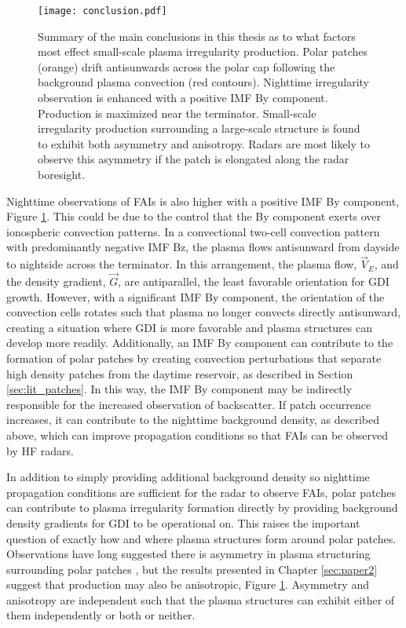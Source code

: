 \begin{figure}
  \texttt{[image: conclusion.pdf]}
  \caption[Irregularity production factors]{Summary of the main conclusions in this thesis as to what factors most effect small-scale plasma irregularity production.  Polar patches (orange) drift antisunwards across the polar cap following the background plasma convection (red contours).  Nighttime irregularity observation is enhanced with a positive IMF By component.  Production is maximized near the terminator.  Small-scale irregularity production surrounding a large-scale structure is found to exhibit both asymmetry and anisotropy.  Radars are most likely to observe this asymmetry if the patch is elongated along the radar boresight.}
  \label{fig:conclusion}
\end{figure}

Nighttime observations of FAIs is also higher with a positive IMF By component, Figure \ref{fig:conclusion}.  This could be due to the control that the By component exerts over ionospheric convection patterns.  In a convectional two-cell convection pattern with predominantly negative IMF Bz, the plasma flows antisunward from dayside to nightside across the terminator.  In this arrangement, the plasma flow, \(\vec{V}_E\), and the density gradient, \(\vec{G}\), are antiparallel, the least favorable orientation for GDI growth.  However, with a significant IMF By component, the orientation of the convection cells rotates such that plasma no longer convects directly antisunward, creating a situation where GDI is more favorable and plasma structures can develop more readily.  Additionally, an IMF By component can contribute to the formation of polar patches by creating convection perturbations that separate high density patches from the daytime reservoir, as described in Section \ref{sec:lit_patches}.  In this way, the IMF By component may be indirectly responsible for the increased observation of backscatter.  If patch occurrence increases, it can contribute to the nighttime background density, as described above, which can improve propagation conditions so that FAIs can be observed by 
HF radars.

In addition to simply providing additional background density so nighttime propagation conditions are sufficient for the radar to observe FAIs, polar patches can contribute to plasma irregularity formation directly by providing background density gradients for GDI to be operational on.  This raises the important question of exactly how and where plasma structures form around polar patches.  Observations have long suggested there is asymmetry in plasma structuring surrounding polar patches \citep{Weber1984,Milan2002b,Koustov2012}, but the results presented in Chapter \ref{sec:paper2} suggest that production may also be anisotropic, Figure \ref{fig:conclusion}.  Asymmetry and anisotropy are independent such that the plasma structures can exhibit either of them independently or both or neither.

